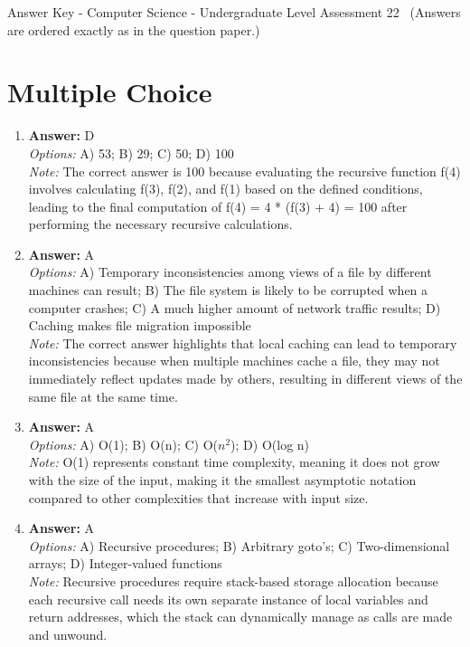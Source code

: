 \documentclass[12pt]{article}
\begin{document}
\begin{center}
Answer Key - Computer Science - Undergraduate Level Assessment 22 \
\small (Answers are ordered exactly as in the question paper.)
\end{center}

\section*{Multiple Choice}
\begin{enumerate}[label=\arabic*.]
\item \textbf{Answer:} D
\\ \textit{Options:} A) 53; B) 29; C) 50; D) 100
\\ \textit{Note:} The correct answer is 100 because evaluating the recursive function f(4) involves calculating f(3), f(2), and f(1) based on the defined conditions, leading to the final computation of f(4) = 4 * (f(3) + 4) = 100 after performing the necessary recursive calculations.
\item \textbf{Answer:} A
\\ \textit{Options:} A) Temporary inconsistencies among views of a file by different machines can result; B) The file system is likely to be corrupted when a computer crashes; C) A much higher amount of network traffic results; D) Caching makes file migration impossible
\\ \textit{Note:} The correct answer highlights that local caching can lead to temporary inconsistencies because when multiple machines cache a file, they may not immediately reflect updates made by others, resulting in different views of the same file at the same time.
\item \textbf{Answer:} A
\\ \textit{Options:} A) O(1); B) O(n); C) O($n^2$); D) O(log n)
\\ \textit{Note:} O(1) represents constant time complexity, meaning it does not grow with the size of the input, making it the smallest asymptotic notation compared to other complexities that increase with input size.
\item \textbf{Answer:} A
\\ \textit{Options:} A) Recursive procedures; B) Arbitrary goto's; C) Two-dimensional arrays; D) Integer-valued functions
\\ \textit{Note:} Recursive procedures require stack-based storage allocation because each recursive call needs its own separate instance of local variables and return addresses, which the stack can dynamically manage as calls are made and unwound.

\end{enumerate}
\end{document}
